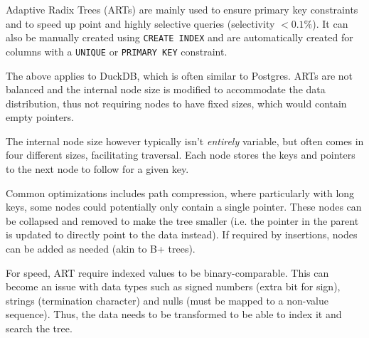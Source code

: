 Adaptive Radix Trees (ARTs) are mainly used to ensure primary key constraints and to speed up point and highly selective queries (selectivity $<0.1\%$).
It can also be manually created using \texttt{CREATE INDEX} and are automatically created for columns with a \texttt{UNIQUE} or \texttt{PRIMARY KEY} constraint.

The above applies to DuckDB, which is often similar to Postgres.
ARTs are not balanced and the internal node size is modified to accommodate the data distribution, thus not requiring nodes to have fixed sizes, which would contain empty pointers.

The internal node size however typically isn't \textit{entirely} variable, but often comes in four different sizes, facilitating traversal.
Each node stores the keys and pointers to the next node to follow for a given key.

Common optimizations includes path compression, where particularly with long keys, some nodes could potentially only contain a single pointer.
These nodes can be collapsed and removed to make the tree smaller (i.e. the pointer in the parent is updated to directly point to the data instead).
If required by insertions, nodes can be added as needed (akin to B+ trees).

For speed, ART require indexed values to be binary-comparable.
This can become an issue with data types such as signed numbers (extra bit for sign), strings (termination character) and nulls (must be mapped to a non-value sequence).
Thus, the data needs to be transformed to be able to index it and search the tree.
